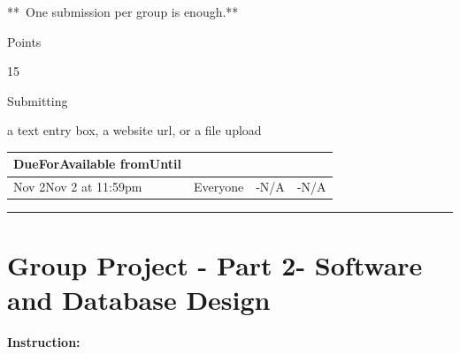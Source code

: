 \documentclass[
]{article}
\begin{document}
**~One submission per group is enough.**

Points

15

Submitting

a text entry box, a website url, or a file upload

\begin{longtable}[]{@{}llll@{}}
\toprule\noalign{}
DueForAvailable fromUntil & & & \\
\midrule\noalign{}
\endhead
\bottomrule\noalign{}
\endlastfoot
Nov 2Nov 2 at 11:59pm & Everyone & -N/A & -N/A \\
\end{longtable}

\begin{center}\rule{0.5\linewidth}{0.5pt}\end{center}

\section{Group Project - Part 2- Software and Database
Design}\label{group-project---part-2--software-and-database-design}

\textbf{Instruction:}
\end{document}
